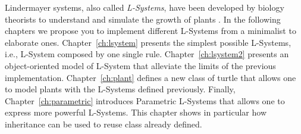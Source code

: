 Lindermayer systems, also called \emph{L-Systems}, have been developed
by biology theorists to understand and simulate the growth of plants
\cite{Pruz90a}. In the following chapters we propose you to implement
different L-Systems from a minimalist to elaborate
ones. Chapter~\ref{ch:lsystem} presents the simplest possible
L-Systems, i.e., L-System composed by one single rule.
Chapter~\ref{ch:lsystem2} presents an object-oriented model of
L-System that alleviate the limits of the previous implementation.
Chapter~\ref{ch:plant} defines a new class of turtle that allows one
to model plants with the L-Systems defined previously. Finally,
Chapter~\ref{ch:parametric} introduces Parametric L-Systems that
allows one to express more powerful L-Systems. This chapter shows in
particular how inheritance can be used to reuse class already defined.
